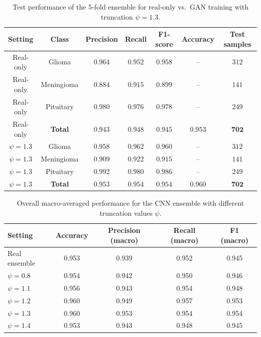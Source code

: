 \begin{table}[H]
\centering
\caption{Test performance of the 5-fold ensemble for real-only vs.\ GAN training with truncation $\psi = 1.3$.}
\label{tab:test_ensemble_per_class_5fold}
\begin{tabular}{ccccccc}
\toprule
Setting      & Class      & Precision & Recall & F1-score & Accuracy & Test samples \\
\midrule
Real-only    & Glioma     & $0.964$ & $0.952$ & $0.958$ & --      & $312$ \\
Real-only    & Meningioma & $0.884$ & $0.915$ & $0.899$ & --      & $141$ \\
Real-only    & Pituitary  & $0.980$ & $0.976$ & $0.978$ & --      & $249$ \\
Real-only    & \textbf{Total} 
             & $\mathbf{0.943}$ & $\mathbf{0.948}$ & $\mathbf{0.945}$ & $\mathbf{0.953}$ & $\mathbf{702}$ \\
\midrule
$\psi = 1.3$ & Glioma     & $0.958$ & $0.962$ & $0.960$ & --      & $312$ \\
$\psi = 1.3$ & Meningioma & $0.909$ & $0.922$ & $0.915$ & --      & $141$ \\
$\psi = 1.3$ & Pituitary  & $0.992$ & $0.980$ & $0.986$ & --      & $249$ \\
$\psi = 1.3$ & \textbf{Total} 
             & $\mathbf{0.953}$ & $\mathbf{0.954}$ & $\mathbf{0.954}$ & $\mathbf{0.960}$ & $\mathbf{702}$ \\
\bottomrule
\end{tabular}
\end{table}

\begin{table}[ht]
    \centering
    \caption{Overall macro-averaged performance for the CNN ensemble with different truncation values $\psi$.}
    \label{tab:macro_overall_truncation_inttest}
    \begin{tabular}{lcccc}
        \toprule
        Setting        & Accuracy & Precision (macro) & Recall (macro) & F1 (macro) \\
        \midrule
        Real ensemble  & 0.953 & 0.939 & 0.952 & 0.945 \\
        $\psi = 0.8$   & 0.954 & 0.942 & 0.950 & 0.946 \\
        $\psi = 1.1$   & 0.956 & 0.943 & 0.954 & 0.948 \\
        $\psi = 1.2$   & 0.960 & 0.949 & 0.957 & 0.953 \\
        $\psi = 1.3$   & 0.960 & 0.953 & 0.954 & 0.954 \\
        $\psi = 1.4$   & 0.953 & 0.943 & 0.948 & 0.945 \\
        \bottomrule
    \end{tabular}
\end{table}

